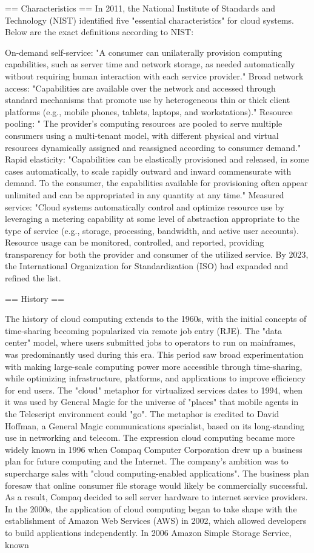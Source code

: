 \documentclass[12pt,a4paper]{report}
\begin{document}
== Characteristics ==
In 2011, the National Institute of Standards and Technology (NIST) identified five "essential characteristics" for cloud systems. Below are the exact definitions according to NIST:

On-demand self-service: "A consumer can unilaterally provision computing capabilities, such as server time and network storage, as needed automatically without requiring human interaction with each service provider."
Broad network access: "Capabilities are available over the network and accessed through standard mechanisms that promote use by heterogeneous thin or thick client platforms (e.g., mobile phones, tablets, laptops, and workstations)."
Resource pooling: " The provider's computing resources are pooled to serve multiple consumers using a multi-tenant model, with different physical and virtual resources dynamically assigned and reassigned according to consumer demand."
Rapid elasticity: "Capabilities can be elastically provisioned and released, in some cases automatically, to scale rapidly outward and inward commensurate with demand. To the consumer, the capabilities available for provisioning often appear unlimited and can be appropriated in any quantity at any time."
Measured service: "Cloud systems automatically control and optimize resource use by leveraging a metering capability at some level of abstraction appropriate to the type of service (e.g., storage, processing, bandwidth, and active user accounts). Resource usage can be monitored, controlled, and reported, providing transparency for both the provider and consumer of the utilized service.
By 2023, the International Organization for Standardization (ISO) had expanded and refined the list.


== History ==

The history of cloud computing extends to the 1960s, with the initial concepts of time-sharing becoming popularized via remote job entry (RJE). The "data center" model, where users submitted jobs to operators to run on mainframes, was predominantly used during this era. This period saw broad experimentation with making large-scale computing power more accessible through time-sharing, while optimizing infrastructure, platforms, and applications to improve efficiency for end users.
The "cloud" metaphor for virtualized services dates to 1994, when it was used by General Magic for the universe of "places" that mobile agents in the Telescript environment could "go". The metaphor is credited to David Hoffman, a General Magic communications specialist, based on its long-standing use in networking and telecom. The expression cloud computing became more widely known in 1996 when Compaq Computer Corporation drew up a business plan for future computing and the Internet. The company's ambition was to supercharge sales with "cloud computing-enabled applications". The business plan foresaw that online consumer file storage would likely be commercially successful. As a result, Compaq decided to sell server hardware to internet service providers.
In the 2000s, the application of cloud computing began to take shape with the establishment of Amazon Web Services (AWS) in 2002, which allowed developers to build applications independently. In 2006 Amazon Simple Storage Service, known
\end{document}
